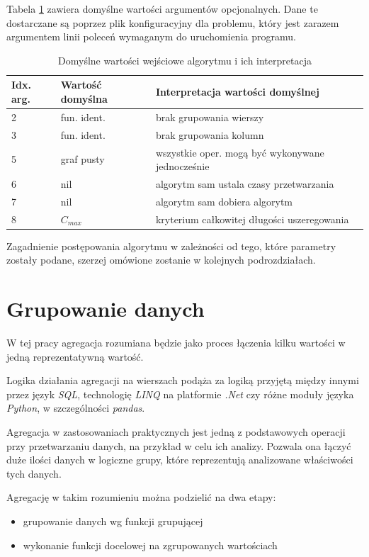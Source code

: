 \documentclass[brudnopis]{xmgr}
\begin{document}
Tabela \ref{tab:args-default} zawiera domyślne wartości argumentów opcjonalnych. Dane te dostarczane są poprzez plik konfiguracyjny dla problemu, który jest zarazem argumentem linii poleceń wymaganym do uruchomienia programu.
\medskip

\begin{table}[!tbh]
\begin{tabular}{|l|l|l|} \hline
Idx. arg. & Wartość domyślna & Interpretacja wartości domyślnej \\ \hline
2 & fun. ident. & brak grupowania wierszy \\ \hline
3 & fun. ident. & brak grupowania kolumn \\ \hline
5 & graf pusty  & wszystkie oper. mogą być wykonywane jednocześnie \\ \hline
6 & nil         & algorytm sam ustala czasy przetwarzania \\ \hline
7 & nil         & algorytm sam dobiera algorytm \\ \hline
8 & $C_{max}$   & kryterium całkowitej długości uszeregowania \\ \hline
\end{tabular}
\caption{Domyślne wartości wejściowe algorytmu i ich interpretacja\label{tab:args-default}}
\end{table}
\medskip

Zagadnienie postępowania algorytmu w zależności od tego, które parametry zostały podane, szerzej omówione zostanie w kolejnych podrozdziałach.


\section{Grupowanie danych}

W tej pracy agregacja rozumiana będzie jako proces łączenia kilku wartości w jedną reprezentatywną wartość.
\medskip

Logika działania agregacji na wierszach podąża za logiką przyjętą między innymi przez język \emph{SQL}, technologię \emph{LINQ} \cite{linq} na platformie \emph{.Net} czy różne moduły języka \emph{Python}, w szczególności \emph{pandas}.
\medskip

Agregacja w zastosowaniach praktycznych jest jedną z podstawowych operacji przy przetwarzaniu danych, na przykład w celu ich analizy.
Pozwala ona łączyć duże ilości danych w logiczne grupy, które reprezentują analizowane właściwości tych danych.
\medskip

Agregację w takim rozumieniu można podzielić na dwa etapy:
\begin{itemize}
    \item grupowanie danych wg funkcji grupującej
    \item wykonanie funkcji docelowej na zgrupowanych wartościach
\end{itemize}
\medskip
\end{document}
